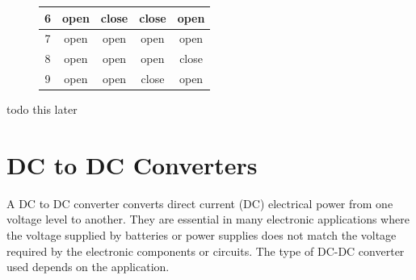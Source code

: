 \begin{enumerate}
\begin{enumerate}
\begin{figure}[H]
\begin{tabular}[ H, 0.7\textwidth]{ |c|c|c|c|c|}
                \hline
                    6 & open & close & close & open \\
                \hline
                    7 & open & open & open & open \\
                \hline
                    8 & open & open & open & close \\
                \hline
                    9 & open & open & close & open \\
                \hline
            \end{tabular}
        \end{figure}
    \end{enumerate}
\end{enumerate}
\label{todo1}  todo this later

\section{DC to DC Converters}
A DC to DC converter converts direct current (DC) electrical power from one voltage level to another. They are essential in many electronic applications where the voltage supplied by batteries or power supplies does not match the voltage required by the electronic components or circuits. The type of DC-DC converter used depends on the application.

